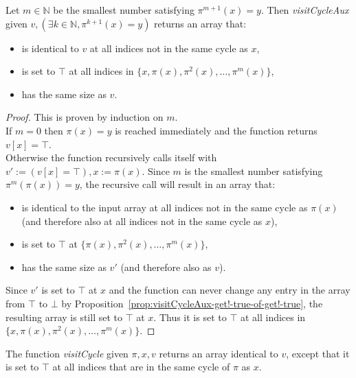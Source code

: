 \begin{proposition}
  \label{prop:visitCycleAux-spec}
  \leanok
  Let $m \in \mathbb{N}$ be the smallest number satisfying $\pi^{m + 1}(x) = y$. Then \emph{visitCycleAux} given $v, (\exists k \in \mathbb{N}, \pi^{k + 1}(x) = y)$ returns an array that:  
  \begin{itemize}
    \item is identical to $v$ at all indices not in the same cycle as $x$,
    \item is set to $\top$ at all indices in $\{x, \pi(x), \pi^2(x), \dots, \pi^m(x)\}$,
    \item has the same size as $v$.
  \end{itemize}
\end{proposition}

\begin{proof}
  \leanok
  This is proven by induction on $m$.\\
  If $m = 0$ then $\pi(x) = y$ is reached immediately and the function returns $v[x] = \top$.\\
  Otherwise the function recursively calls itself with $v' := (v[x] = \top), x := \pi(x)$. Since $m$ is the smallest number satisfying $\pi^m(\pi(x)) = y$, the recursive call will result in an array that:
  \begin{itemize}
    \item is identical to the input array at all indices not in the same cycle as $\pi(x)$ (and therefore also at all indices not in the same cycle as $x$),
    \item is set to $\top$ at $\{\pi(x), \pi^2(x), \dots, \pi^m(x)\}$,
    \item has the same size as $v'$ (and therefore also as $v$).
  \end{itemize}
  Since $v'$ is set to $\top$ at $x$ and the function can never change any entry in the array from $\top$ to $\bot$ by Proposition~\ref{prop:visitCycleAux-get!-true-of-get!-true}, the resulting array is still set to $\top$ at $x$. Thus it is set to $\top$ at all indices in $\{x, \pi(x), \pi^2(x), \dots, \pi^m(x)\}$.
\end{proof}

\begin{proposition}
  \label{prop:visitCycle-spec}
  \leanok
  The function \emph{visitCycle} given $\pi, x, v$ returns an array identical to $v$, except that it is set to $\top$ at all indices that are in the same cycle of $\pi$ as $x$.
\end{proposition}

